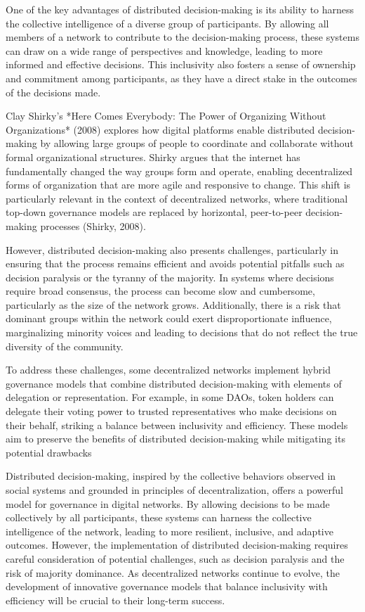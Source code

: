 \documentclass[12pt,twoside]{article}
\begin{document}
One of the key advantages of distributed decision-making is its ability to harness the collective intelligence of a diverse group of participants. By allowing all members of a network to contribute to the decision-making process, these systems can draw on a wide range of perspectives and knowledge, leading to more informed and effective decisions. This inclusivity also fosters a sense of ownership and commitment among participants, as they have a direct stake in the outcomes of the decisions made.

Clay Shirky's *Here Comes Everybody: The Power of Organizing Without Organizations* (2008) explores how digital platforms enable distributed decision-making by allowing large groups of people to coordinate and collaborate without formal organizational structures. Shirky argues that the internet has fundamentally changed the way groups form and operate, enabling decentralized forms of organization that are more agile and responsive to change. This shift is particularly relevant in the context of decentralized networks, where traditional top-down governance models are replaced by horizontal, peer-to-peer decision-making processes (Shirky, 2008).

However, distributed decision-making also presents challenges, particularly in ensuring that the process remains efficient and avoids potential pitfalls such as decision paralysis or the tyranny of the majority. In systems where decisions require broad consensus, the process can become slow and cumbersome, particularly as the size of the network grows. Additionally, there is a risk that dominant groups within the network could exert disproportionate influence, marginalizing minority voices and leading to decisions that do not reflect the true diversity of the community.

To address these challenges, some decentralized networks implement hybrid governance models that combine distributed decision-making with elements of delegation or representation. For example, in some DAOs, token holders can delegate their voting power to trusted representatives who make decisions on their behalf, striking a balance between inclusivity and efficiency. These models aim to preserve the benefits of distributed decision-making while mitigating its potential drawbacks

Distributed decision-making, inspired by the collective behaviors observed in social systems and grounded in principles of decentralization, offers a powerful model for governance in digital networks. By allowing decisions to be made collectively by all participants, these systems can harness the collective intelligence of the network, leading to more resilient, inclusive, and adaptive outcomes. However, the implementation of distributed decision-making requires careful consideration of potential challenges, such as decision paralysis and the risk of majority dominance. As decentralized networks continue to evolve, the development of innovative governance models that balance inclusivity with efficiency will be crucial to their long-term success.
\end{document}
